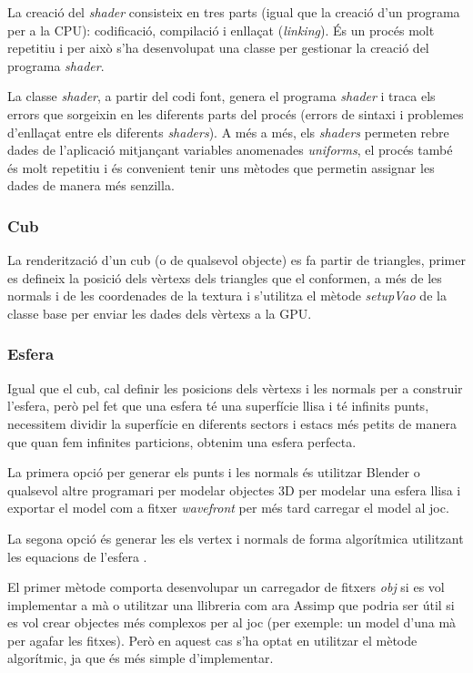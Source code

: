 ﻿\documentclass[10pt,a4paper,twocolumn,twoside]{article}
\begin{document}
La creació del \textit{shader} consisteix en tres parts (igual que la creació d'un programa per a
la CPU): codificació, compilació i enllaçat (\textit{linking}). És un procés molt repetitiu i per
això s'ha desenvolupat una classe per gestionar la creació del programa \textit{shader}.

La classe \textit{shader}, a partir del codi font, genera el programa \textit{shader} i traca els
errors que sorgeixin en les diferents parts del procés (errors de sintaxi i problemes d'enllaçat
entre els diferents \textit{shaders}). A més a més, els \textit{shaders} permeten rebre dades de
l'aplicació mitjançant variables anomenades \textit{uniforms}, el procés també és molt repetitiu i
és convenient tenir uns mètodes que permetin assignar les dades de manera més senzilla.

\subsubsection{Cub}
La renderització d'un cub (o de qualsevol objecte) es fa partir de triangles, primer es defineix la
posició dels vèrtexs dels triangles que el conformen, a més de les normals i de les coordenades de
la textura i s'utilitza el mètode \textit{setupVao} de la classe base per enviar les dades dels
vèrtexs a la GPU.\@

\subsubsection{Esfera}
Igual que el cub, cal definir les posicions dels vèrtexs i les normals per a construir l'esfera,
però pel fet que una esfera té una superfície llisa i té infinits punts, necessitem dividir la
superfície en diferents sectors i estacs més petits de manera que quan fem infinites particions,
obtenim una esfera perfecta.

La primera opció per generar els punts i les normals és utilitzar Blender o qualsevol altre
programari per modelar objectes 3D per modelar una esfera llisa i exportar el model com a fitxer
\textit{wavefront} per més tard carregar el model al joc.

La segona opció és generar les els vertex i normals de forma algorítmica utilitzant les equacions
de l'esfera \cite{glSphere}.

El primer mètode comporta desenvolupar un carregador de fitxers \textit{obj} si es vol implementar
a mà o utilitzar una llibreria com ara Assimp\cite{Assimp} que podria ser útil si es vol crear
objectes més complexos per al joc (per exemple: un model d'una mà per agafar les fitxes). Però en
aquest cas s'ha optat en utilitzar el mètode algorítmic, ja que és més simple d'implementar.
\end{document}

